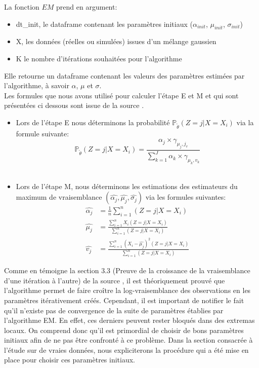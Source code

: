 \documentclass[a4paper,french,10pt]{article}
\begin{document}
La fonction $EM$ prend en argument:
\begin{itemize}
	\item dt\_init, le dataframe contenant les paramètres initiaux ($\alpha_{init}$, $\mu_{init}$, $\sigma_{init}$)
	\item X, les données (réelles ou simulées) issues d'un mélange gaussien
	\item K le nombre d'itérations souhaitées pour l'algorithme
\end{itemize}  
Elle retourne un dataframe contenant les valeurs des
paramètres estimées par l'algorithme, à savoir $\alpha$, $\mu$ et $\sigma$. \\
Les formules que nous avons utilisé pour calculer l'étape E et M et qui sont présentées ci dessous sont issue de la source \cite{EM_algorithm}.
\begin{itemize}
	\item Lors de l'étape E nous déterminons la probabilité $\mathbb{P}_{\tilde{\theta}}(Z = j| X = X_i)$ via la formule suivante:
	\[
	\mathbb{P}_{\tilde{\theta}}(Z = j| X = X_i) = \frac{\alpha_j \times \gamma_{\mu_j, j_v}}{\sum_{k=1}^{J} \alpha_k \times \gamma_{\mu_k, v_k}}
	\] \\
	\item Lors de l'étape M, nous déterminons les estimations des estimateurs du maximum de vraisemblance $(\widehat{\alpha_j}, \widehat{\mu_j}, \widehat{\sigma_j})$ via les formules suivantes:
	\begin{align*}
		\widehat{\alpha_j} &= \displaystyle\frac{1}{n}\sum_{i=1}^n (Z=j|X=X_i) \\
		\widehat{\mu_j} &= \displaystyle\frac{\displaystyle\sum_{i=1}^n X_i (Z=j|X=X_i)}{\displaystyle\sum_{i=1}^n (Z=j|X=X_i)} \\
		\widehat{v_j} &= \displaystyle\frac{\displaystyle\sum_{i=1}^n (X_i -\widehat{\mu_j})^2 (Z=j|X=X_i)}{\displaystyle\sum_{i=1}^n (Z=j|X=X_i)}
	\end{align*} 
\end{itemize}
\vspace{1mm}
Comme en témoigne la section 3.3 (Preuve de la croissance de la vraisemblance d’une itération à l’autre) de la source \cite{EM_algorithm}, il est théoriquement prouvé que l'algorithme permet de faire croître la log-vraisemblance des observations
en les paramètres itérativement créés.
Cependant, il est important de notifier le fait qu'il n'existe pas de convergence de la suite de paramètres établies par l'algorithme EM. En effet, ces derniers peuvent rester bloqués dans des extremas locaux. On comprend donc qu'il est primordial de choisir de bons paramètres initiaux afin de ne pas être confronté à ce problème. Dans la section consacrée à l'étude sur de vraies données, nous expliciterons la procédure qui a été mise en place pour choisir ces paramètres initiaux.
\end{document}
